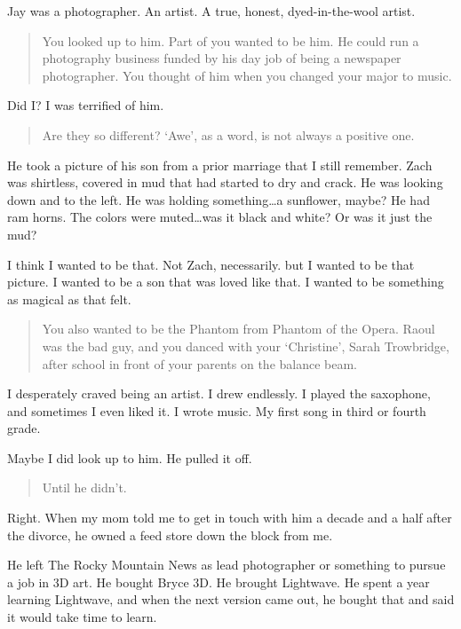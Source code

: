Jay was a photographer. An artist. A true, honest, dyed-in-the-wool artist.

\begin{quote}
You looked up to him. Part of you wanted to be him. He could run a photography business funded by his day job of being a newspaper photographer. You thought of him when you changed your major to music.
\end{quote}

Did I? I was terrified of him.

\begin{quote}
Are they so different? `Awe', as a word, is not always a positive one.
\end{quote}

He took a picture of his son from a prior marriage that I still remember. Zach was shirtless, covered in mud that had started to dry and crack. He was looking down and to the left. He was holding something\ldots{}a sunflower, maybe? He had ram horns. The colors were muted\ldots{}was it black and white? Or was it just the mud?

I think I wanted to be that. Not Zach, necessarily. but I wanted to be that picture. I wanted to be a son that was loved like that. I wanted to be something as magical as that felt.

\begin{quote}
You also wanted to be the Phantom from Phantom of the Opera. Raoul was the bad guy, and you danced with your `Christine', Sarah Trowbridge, after school in front of your parents on the balance beam.
\end{quote}

I desperately craved being an artist. I drew endlessly. I played the saxophone, and sometimes I even liked it. I wrote music. My first song in third or fourth grade.

Maybe I did look up to him. He pulled it off.

\begin{quote}
Until he didn't.
\end{quote}

Right. When my mom told me to get in touch with him a decade and a half after the divorce, he owned a feed store down the block from me.

He left The Rocky Mountain News as lead photographer or something to pursue a job in 3D art. He bought Bryce 3D. He brought Lightwave. He spent a year learning Lightwave, and when the next version came out, he bought that and said it would take time to learn.


